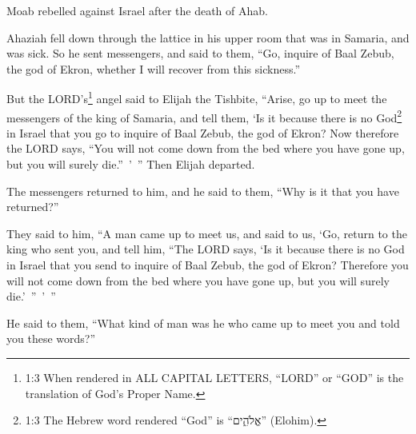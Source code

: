 
\newpage
\null
\thispagestyle{empty}
\newpage






\vspace{-1.36in}


\mychapter{} \myverse*{}Moab rebelled against Israel after the death of Ahab.

\myverse{}Ahaziah fell down through the lattice in his upper room that was
in Samaria, and was sick. So he sent messengers, and said to them, “Go, inquire of Baal Zebub, the god
of Ekron, whether I will recover from this sickness.”

\myverse{}But the LORD’s\footnote{1:3 When rendered in ALL CAPITAL LETTERS, “LORD” or “GOD” is the translation of God’s Proper Name.}
angel said to Elijah the Tishbite, “Arise, go up to meet the messengers of the king of Samaria, and tell
them, ‘Is it because there is no God\footnote{1:3 The Hebrew word rendered “God” is “אֱלֹהִ֑ים” (Elohim).} in Israel that you
go to inquire of Baal Zebub, the god of Ekron?
\myverse{}Now therefore the LORD says, “You will not come down from the bed where you
have gone up, but you will surely die.” ’ ” Then Elijah departed.

\myverse{}The messengers returned to him, and he said to them, “Why is it
that you have returned?”

\myverse{}They said to him, “A man came up to meet us, and said to us, ‘Go,
return to the king who sent you, and tell him, “The LORD says, ‘Is it because there is no God in Israel
that you send to inquire of Baal Zebub, the god of Ekron? Therefore you will not come down from the bed
where you have gone up, but you will surely die.’ ” ’ ”

\myverse{}He said to them, “What kind of man was he who came up to meet you
and told you these words?”

